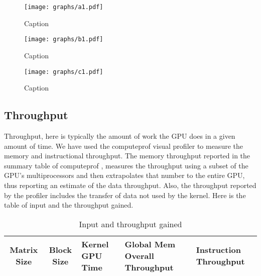 \documentclass[10pt, twocolumn]{article}
\begin{document}
    \begin{center}
    \begin{figure}
        \texttt{[image: graphs/a1.pdf]}
        \caption{Caption}
        \label{fig:time_taken1}
    \end{figure}
    \end{center}
    
    \begin{center}
    \begin{figure}
        \texttt{[image: graphs/b1.pdf]}
        \caption{Caption}
        \label{fig:time_taken2}
    \end{figure}
    \end{center}

    \begin{center}
    \begin{figure}
        \texttt{[image: graphs/c1.pdf]}
        \caption{Caption}
        \label{fig:time_taken3}
    \end{figure}
    \end{center}

    \subsection{Throughput}
    Throughput, here is typically the amount of work the GPU does in a given amount of time.
    We have used the computeprof visual profiler to measure the memory and instructional throughput.
    The memory throughput reported in the summary table of computeprof ,  measures  the throughput using a subset of the GPU’s multiprocessors and then extrapolates that number to the entire GPU, thus reporting an estimate of the data throughput.
    Also, the throughput reported by the profiler includes the transfer of data not used by the kernel.
    Here is the table of input and the throughput gained.

    \begin{table}\footnotesize
    \centering
        \begin{tabular}{ | c | c | p{1.2cm} | p{1.5cm} | p{1.0cm} | }
        \hline
        Matrix Size & Block Size & Kernel GPU Time & Global Mem Overall Throughput & Instruction Throughput \\
        \hline
        \end{tabular}
        \caption{Input and throughput gained}
        \label{tab:input_throughput}
    \end{table}
\end{document}
